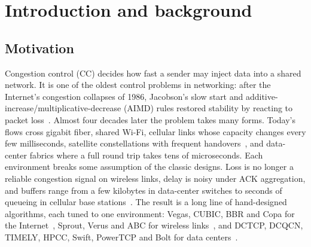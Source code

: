 \chapter{Introduction and background}
\label{ch:background}

\section{Motivation}
\label{sec:motivation}

Congestion control (CC) decides how fast a sender may inject data into a shared network. It is one of the oldest control problems in networking: after the Internet's congestion collapses of 1986, Jacobson's slow start and additive-increase/multiplicative-decrease (AIMD) rules restored stability by reacting to packet loss~\cite{jacobson1988congestion,chiu1989analysis}. Almost four decades later the problem takes many forms. Today's flows cross gigabit fiber, shared Wi-Fi, cellular links whose capacity changes every few milliseconds, satellite constellations with frequent handovers~\cite{narayanan2020first,mohan2024multifaceted}, and data-center fabrics where a full round trip takes tens of microseconds. Each environment breaks some assumption of the classic designs. Loss is no longer a reliable congestion signal on wireless links, delay is noisy under ACK aggregation, and buffers range from a few kilobytes in data-center switches to seconds of queueing in cellular base stations~\cite{gettys2012bufferbloat,jiang2012tackling}. The result is a long line of hand-designed algorithms, each tuned to one environment: Vegas, CUBIC, BBR and Copa for the Internet~\cite{brakmo1995vegas,ha2008cubic,cardwell2016bbr,arun2018copa}, Sprout, Verus and ABC for wireless links~\cite{winstein2013sprout,zaki2015verus,goyal2020abc}, and DCTCP, DCQCN, TIMELY, HPCC, Swift, PowerTCP and Bolt for data centers~\cite{alizadeh2010dctcp,zhu2015dcqcn,mittal2015timely,li2019hpcc,kumar2020swift,addanki2022powertcp,arslan2023bolt}.

